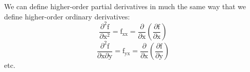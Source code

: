 We can define higher-order partial derivatives in much the same way that we define
higher-order ordinary derivatives:
\[ \frac{\partial ^2 \mathrm{f}}{\partial \mathrm{x}^2 } 
= \mathrm{f}_{\mathrm{xx}} = \frac{\partial}{\partial \mathrm{x}}
\left ( \frac{\partial \mathrm{f}}{\partial \mathrm{x}} \right ) \]
\[ \frac{\partial ^2 \mathrm{f}}{\partial \mathrm{x} \partial \mathrm{y}}
= \mathrm{f}_{\mathrm{yx}}
= \frac{\partial}{\partial \mathrm{x}}
\left ( \frac{\partial \mathrm{f}}{\partial \mathrm{y}} \right ) \]
etc.